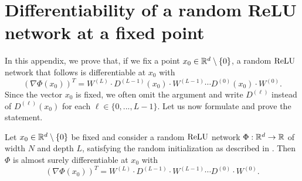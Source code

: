 
\section{Differentiability of a random ReLU network at a fixed point} \label{app:diff}

In this appendix, we prove that, if we fix a point $x_0 \in \mathbb{R}^d \setminus \{0\}$, a random $\operatorname{ReLU}$ network that follows  is differentiable at $x_0$ with
\begin{equation*}
\left(\nabla \Phi (x_0)\right)^T = W^{(L)} \cdot D^{(L-1)}(x_0) \cdot W^{(L-1)}\cdots D^{(0)}(x_0) \cdot W^{(0)}.
\end{equation*}
Since the vector $x_0$ is fixed, we often omit the argument and write $D^{(\ell)}$ instead of $D^{(\ell)}(x_0)$ for each $\ell \in \{0,...,L-1\}$. 
Let us now formulate and prove the statement.
\begin{theorem}
Let $x_0 \in \mathbb{R}^d \setminus \{0\}$ be fixed and consider a random $\operatorname{ReLU}$ network $\Phi: \mathbb{R}^d \to \mathbb{R}$ of width $N$ and depth $L$, satisfying the random initialization as described in . 
Then $\Phi$ is almost surely differentiable at $x_0$ with
\begin{equation} \label{eq:des}
\left(\nabla \Phi(x_0)\right)^T = W^{(L)} \cdot D^{(L-1)}\cdot W^{(L-1)} \cdots D^{(0)}\cdot W^{(0)}.
\end{equation}
\end{theorem}

